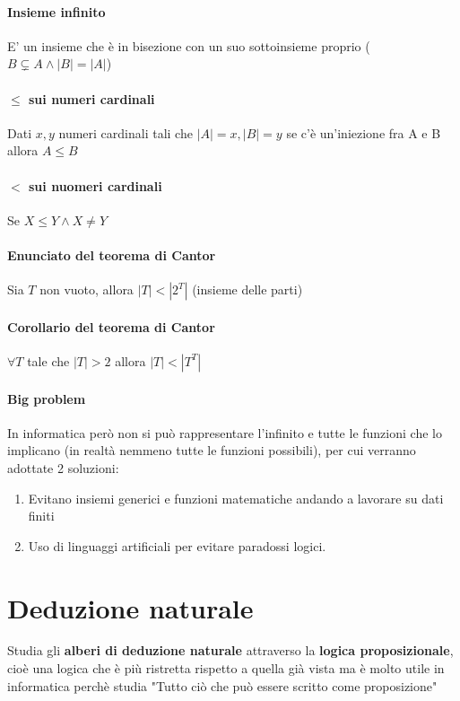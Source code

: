 \documentclass{article}
\begin{document}
\paragraph{Insieme infinito} E' un insieme che è in bisezione con un suo sottoinsieme proprio ($B\subsetneq A \land |B|=|A|$)

\paragraph{$\leq$ sui numeri cardinali} Dati $x,y$ numeri cardinali tali che $|A| = x, |B| = y$ se c'è un'iniezione fra A e B allora $A\leq B$

\paragraph{$<$ sui nuomeri cardinali} Se $X \leq Y \land X \not= Y$


\paragraph{Enunciato del teorema di Cantor} Sia $T$ non vuoto, allora $|T| < |2^T|$ (insieme delle parti)

\paragraph{Corollario del teorema di Cantor} $\forall T $ tale che $ |T|>2$ allora $|T| <|T^T|$

\paragraph{Big problem} In informatica però non si può rappresentare l'infinito e tutte le funzioni che lo implicano (in realtà nemmeno tutte le funzioni possibili), per cui verranno adottate 2 soluzioni:
\begin{enumerate}
    \item Evitano insiemi generici e funzioni matematiche andando a lavorare su dati finiti
    \item Uso di linguaggi artificiali per evitare paradossi logici.
\end{enumerate}



\section{Deduzione naturale}
Studia gli \textbf{alberi di deduzione naturale} attraverso la \textbf{logica proposizionale}, cioè una logica che è più ristretta rispetto a quella già vista ma è molto utile in informatica perchè studia "Tutto ciò che può essere scritto come proposizione"
\end{document}
